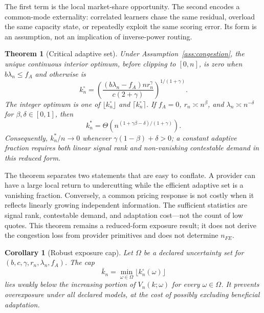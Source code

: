 \documentclass[sigconf,nonacm]{acmart}
\newtheorem{theorem}{Theorem}
\newtheorem{corollary}{Corollary}
\newcommand{\1}{\mathbf 1}
\begin{document}
The first term is the local market-share opportunity.  The second encodes a
common-mode externality: correlated learners chase the same residual, overload
the same capacity state, or repeatedly exploit the same scoring error.  Its
form is an assumption, not an implication of inverse-power routing.

\begin{theorem}[Critical adaptive set]
\label{thm:congestion}
Under Assumption~\ref{ass:congestion}, the unique continuous interior optimum,
before clipping to $[0,n]$, is zero when $b\lambda_n\le f_A$ and otherwise is
\begin{equation}
k_n^\circ=
\left(\frac{(b\lambda_n-f_A)n r_n^\gamma}
{c(2+\gamma)}\right)^{1/(1+\gamma)}.
\label{eq:kstar}
\end{equation}
The integer optimum is one of $\lfloor k_n^\circ\rfloor$ and
$\lceil k_n^\circ\rceil$.  If $f_A=0$, $r_n\asymp n^\beta$, and
$\lambda_n\asymp n^{-\delta}$ for $\beta,\delta\in[0,1]$, then
\begin{equation}
k_n^*=\Theta\!\left(n^{(1+\gamma\beta-\delta)/(1+\gamma)}\right).
\label{eq:kstarscaling}
\end{equation}
Consequently, $k_n^*/n\to0$ whenever $\gamma(1-\beta)+\delta>0$; a
constant adaptive fraction requires both linear signal rank and non-vanishing
contestable demand in this reduced form.
\end{theorem}

The theorem separates two statements that are easy to conflate.  A provider
can have a large local return to undercutting while the efficient adaptive set
is a vanishing fraction.  Conversely, a common pricing response is not costly
when it reflects linearly growing independent information.  The sufficient
statistics are signal rank, contestable demand, and adaptation cost---not the
count of low quotes.  This theorem remains a reduced-form exposure result; it
does not derive the congestion loss from provider primitives and does not
determine $n_{FE}$.

\begin{corollary}[Robust exposure cap]
Let $\Omega$ be a declared uncertainty set for
$(b,c,\gamma,r_n,\lambda_n,f_A)$.  The cap
\begin{equation}
\bar k_n=\min_{\omega\in\Omega}\lfloor k_n^\circ(\omega)\rfloor
\end{equation}
lies weakly below the increasing portion of $V_n(k;\omega)$ for every
$\omega\in\Omega$.  It prevents overexposure under all declared models, at the
cost of possibly excluding beneficial adaptation.
\end{corollary}
\end{document}
